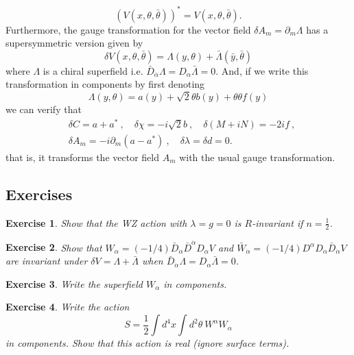 \documentclass[a4paper,12pt]{article}
\newtheorem{exe}{Exercise}
\numberwithin{equation}{section}
\numberwithin{exe}{section}
\newcommand{\p}{{\partial}}
\newcommand{\Db}{{\bar D}}
\newcommand{\yb}{{\bar y}}
\renewcommand{\a}{{\alpha}}
\newcommand{\ad}{{\dot\alpha}}
\renewcommand{\d}{{\delta}}
\renewcommand{\l}{{\lambda}}
\renewcommand{\L}{{\Lambda}}
\renewcommand{\t}{{\theta}}
\newcommand{\tb}{{\bar\theta}}
\begin{document}
	\begin{equation}
	(V(x,\t,\tb))^* = V(x,\t,\tb).
	\end{equation}
Furthermore, the gauge transformation for the vector field $\d A_m = \p_m\L$ has a supersymmetric version given by
	\begin{equation}
	\d V(x,\t,\tb) = \L(y,\t) + \bar\L(\yb,\tb)
	\end{equation}
where $\L$ is a chiral superfield i.e. $\Db_\ad\L = D_\a\bar\L = 0$. And, if we write this transformation in components by first denoting
	\begin{equation}
	\L(y,\t) = a(y) + \sqrt 2\t b(y) + \t\t f(y)
	\end{equation}
we can verify that
	\begin{equation}\label{WZgauge}
		\begin{aligned}
		&\d C = a+ a^*\ ,\quad \d\chi = -i\sqrt 2 b\ ,\quad \d(M+iN) = -2if\ ,\\
		&\d A_m = -i\p_m(a-a^*)\ ,\quad \d\l = \d d = 0.
		\end{aligned}
	\end{equation}
that is, it transforms the vector field $A_m$ with the usual gauge transformation.

\subsection{Exercises}

	\begin{exe}
	Show that the WZ action with $\l = g = 0$ is $R$-invariant if $n = \frac12$.
	\end{exe}

	\begin{exe}
	Show that $W_\a = (-1/4)\Db_\ad \Db^\ad D_\a V$ and $ \bar W_\ad = (-1/4)D^\a D_\a \Db_\ad V$ are invariant under $\d V = \Lambda + \bar\Lambda$ when $\Db_\ad \Lambda = D_\a \bar\Lambda = 0$.
	\end{exe}

	\begin{exe}
	Write the superfield $W_\a$ in components.
	\end{exe}

	\begin{exe}
	Write the action
		\begin{equation}
		S = \frac12 \int d^4 x \int d^2 \t\ W^\a W_\a
		\end{equation}
	in components. Show that this action is real (ignore surface terms).
	\end{exe}
\end{document}
